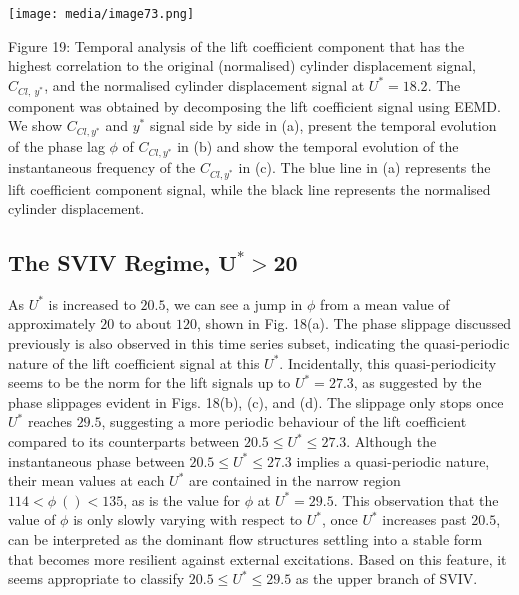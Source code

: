 \documentclass[]{article}
\begin{document}
\texttt{[image: media/image73.png]}

\protect\hypertarget{_Ref41048365}{}{\protect\hypertarget{_Toc41048842}{}{}}Figure
19: Temporal analysis of the lift coefficient component that has the
highest correlation to the original (normalised) cylinder displacement
signal, \(C_{Cl,\ y^{*}}\), and the normalised cylinder displacement
signal at \(U^{*} = 18.2\). The component was obtained by decomposing
the lift coefficient signal using EEMD. We show \(C_{Cl,y^{*}}\) and
\(y^{*}\) signal side by side in (a), present the temporal evolution of
the phase lag \(\phi\) of \(C_{Cl,y^{*}}\) in (b) and show the temporal
evolution of the instantaneous frequency of the \(C_{Cl,y^{*}}\) in (c).
The blue line in (a) represents the lift coefficient component signal,
while the black line represents the normalised cylinder displacement.

\hypertarget{the-sviv-regime-mathbfumathbfmathbf-20}{\subsection{\texorpdfstring{The
SVIV Regime,
\(\mathbf{U}^{\mathbf{*}}\mathbf{> 20}\)}{The SVIV Regime, \textbackslash{}mathbf\{U\}\^{}\{\textbackslash{}mathbf\{*\}\}\textbackslash{}mathbf\{\textgreater{} 20\}}}\label{the-sviv-regime-mathbfumathbfmathbf-20}}

As \(U^{*}\) is increased to \(20.5\), we can see a jump in \(\phi\)
from a mean value of approximately \(20\) to about \(120\), shown in
Fig. 18(a). The phase slippage discussed previously is also observed in
this time series subset, indicating the quasi-periodic nature of the
lift coefficient signal at this \(U^{*}\). Incidentally, this
quasi-periodicity seems to be the norm for the lift signals up to
\(U^{*} = 27.3\), as suggested by the phase slippages evident in Figs.
18(b), (c), and (d). The slippage only stops once \(U^{*}\) reaches
\(29.5\), suggesting a more periodic behaviour of the lift coefficient
compared to its counterparts between \(20.5 \leq U^{*} \leq 27.3\).
Although the instantaneous phase between \(20.5 \leq U^{*} \leq 27.3\)
implies a quasi-periodic nature, their mean values at each \(U^{*}\) are
contained in the narrow region \(114 < \phi\ \left( \right) < 135\), as
is the value for \(\phi\) at \(U^{*} = 29.5\). This observation that the
value of \(\phi\) is only slowly varying with respect to \(U^{*}\), once
\(U^{*}\) increases past \(20.5\), can be interpreted as the dominant
flow structures settling into a stable form that becomes more resilient
against external excitations. Based on this feature, it seems
appropriate to classify \(20.5 \leq U^{*} \leq 29.5\) as the upper
branch of SVIV.
\end{document}
